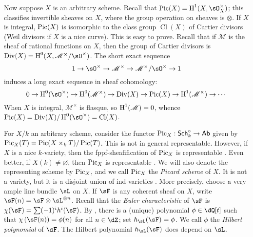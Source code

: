 \documentclass{article}
\begin{document}


Now suppose $X$ is an arbitrary scheme. Recall that 
$\picard(X)=\h^1(X,\sO_X^\times)$; this classifies invertible sheaves on 
$X$, where the group operation on sheaves is $\otimes$. If $X$ is integral, 
$\operatorname{Pic}(X)$ is isomorphic to the class group $\operatorname{Cl}(X)$ of Cartier 
divisors (Weil divisors if $X$ is a nice curve). This is easy to prove. Recall 
that if $\mathscr{M}$ is the sheaf of rational functions on $X$, then the 
group of Cartier divisors is $\divisor(X) = \h^0(X,\mathscr{M}^\times/\sO^\times)$. 
The short exact sequence 
\[
  1 \to \sO^\times \to \mathscr{M}^\times\to \mathscr{M}^\times/\sO^\times \to 1
\]
induces a long exact sequence in sheaf cohomology:
\[
  0 \to \h^0(\sO^\times) \to \h^0(\mathscr{M}^\times) \to \divisor(X) \to \picard(X) \to \h^1(\mathscr{M}^\times) \to \cdots
\]
When $X$ is integral, $\mathscr{M}^\times$ is flasque, so 
$\operatorname{H}^1(\mathscr{M}) = 0$, whence 
$\picard(X)=\divisor(X)/\h^0(\sO^\times) = \operatorname{Cl}(X)$. 

For $X/k$ an arbitrary scheme, consider the functor 
$\operatorname{Pic}_X:\mathsf{Sch}_k^\circ\to\mathsf{Ab}$ given by 
$\operatorname{Pic}_X(T) = \operatorname{Pic}(X\times_k T)/\operatorname{Pic}(T)$. This is not in general 
representable. However, if $X$ is a nice $k$-variety, then the 
fppf-sheafification of $\operatorname{Pic}_X$ is representable \cite[4.1.38]{kl05}. Even 
better, if $X(k)\ne\varnothing$, then $\operatorname{Pic}_X$ is representable 
\cite[2.5]{kl05}. We will also denote the representing scheme by $\operatorname{Pic}_X$, and 
we call $\operatorname{Pic}_X$ the \emph{Picard scheme} of $X$. It is not a variety, but it 
is a disjoint union of ind-varieties \cite[4.8]{kl05}. More precisely, choose 
a very ample line bundle $\sL$ on $X$. If $\sF$ is any coherent 
sheaf on $X$, write 
$\sF(n) = \sF\otimes\sL^{\otimes n}$. Recall that the 
\emph{Euler characteristic} of $\sF$ is 
$\chi(\sF) = \sum (-1)^i h^i(\sF)$. By \cite[2.5.3]{gr61}, 
there is a (unique) polynomial $\phi\in \dQ[t]$ such that 
$\chi\left(\sF(n)\right) = \phi(n)$ for all 
$n\in\dZ$; set $h_\sL(\sF) = \phi$. We call $\phi$ the 
\emph{Hilbert polynomial} of $\sF$. The Hilbert polynomial 
$h_\sL(\sF)$ does depend on $\sL$.
\end{document}
